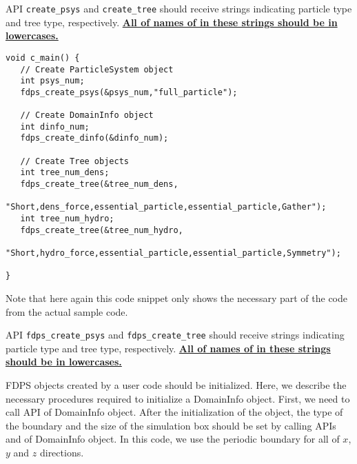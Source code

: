 API \texttt{create\_psys} and \texttt{create\_tree} should receive
strings indicating particle type and tree type, respectively. \textbf{\ul{All  of names of \structures in these strings should be in lowercases.}}
\endifFtn
\ifC %
\begin{lstlisting}[caption=Creation of necessary FDPS objects]
void c_main() {   
   // Create ParticleSystem object
   int psys_num;
   fdps_create_psys(&psys_num,"full_particle");
   
   // Create DomainInfo object
   int dinfo_num;
   fdps_create_dinfo(&dinfo_num);
   
   // Create Tree objects
   int tree_num_dens;
   fdps_create_tree(&tree_num_dens,
                    "Short,dens_force,essential_particle,essential_particle,Gather");
   int tree_num_hydro;
   fdps_create_tree(&tree_num_hydro,
                    "Short,hydro_force,essential_particle,essential_particle,Symmetry");

}
\end{lstlisting}
Note that here again this code snippet only shows the necessary part of the code from the actual sample code.

API \texttt{fdps\_create\_psys} and \texttt{fdps\_create\_tree} should receive
strings indicating particle type and tree type, respectively. \textbf{\ul{All of names of \structures in these strings should be in lowercases.}}
\endifC


FDPS objects created by a user code should be initialized. Here, we describe the necessary procedures required to initialize a \textsf{DomainInfo} object. First, we need to call API  of \textsf{DomainInfo} object. After the initialization of the object, the type of the boundary and the size of the simulation box should be set by calling APIs  and  of \textsf{DomainInfo} object. In this code, we use the periodic boundary for all of $x$, $y$ and $z$ directions.

